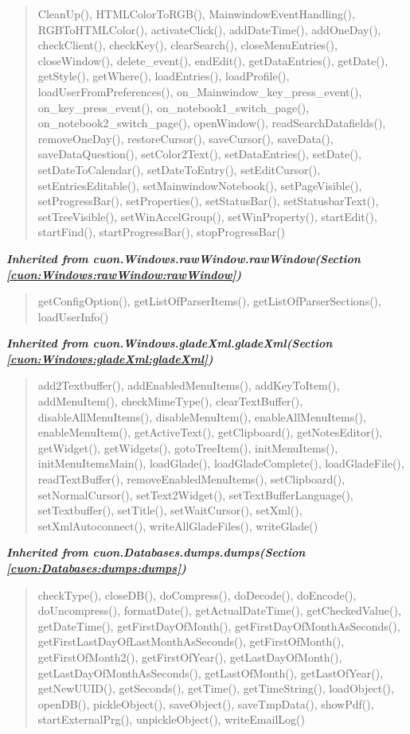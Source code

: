 \begin{quote}
CleanUp(), HTMLColorToRGB(), MainwindowEventHandling(), RGBToHTMLColor(), activateClick(), addDateTime(), addOneDay(), checkClient(), checkKey(), clearSearch(), closeMenuEntries(), closeWindow(), delete\_event(), endEdit(), getDataEntries(), getDate(), getStyle(), getWhere(), loadEntries(), loadProfile(), loadUserFromPreferences(), on\_Mainwindow\_key\_press\_event(), on\_key\_press\_event(), on\_notebook1\_switch\_page(), on\_notebook2\_switch\_page(), openWindow(), readSearchDatafields(), removeOneDay(), restoreCursor(), saveCursor(), saveData(), saveDataQuestion(), setColor2Text(), setDataEntries(), setDate(), setDateToCalendar(), setDateToEntry(), setEditCursor(), setEntriesEditable(), setMainwindowNotebook(), setPageVisible(), setProgressBar(), setProperties(), setStatusBar(), setStatusbarText(), setTreeVisible(), setWinAccelGroup(), setWinProperty(), startEdit(), startFind(), startProgressBar(), stopProgressBar()
\end{quote}

\large{\textbf{\textit{Inherited from cuon.Windows.rawWindow.rawWindow\textit{(Section \ref{cuon:Windows:rawWindow:rawWindow})}}}}

\begin{quote}
getConfigOption(), getListOfParserItems(), getListOfParserSections(), loadUserInfo()
\end{quote}

\large{\textbf{\textit{Inherited from cuon.Windows.gladeXml.gladeXml\textit{(Section \ref{cuon:Windows:gladeXml:gladeXml})}}}}

\begin{quote}
add2Textbuffer(), addEnabledMenuItems(), addKeyToItem(), addMenuItem(), checkMimeType(), clearTextBuffer(), disableAllMenuItems(), disableMenuItem(), enableAllMenuItems(), enableMenuItem(), getActiveText(), getClipboard(), getNotesEditor(), getWidget(), getWidgets(), gotoTreeItem(), initMenuItems(), initMenuItemsMain(), loadGlade(), loadGladeComplete(), loadGladeFile(), readTextBuffer(), removeEnabledMenuItems(), setClipboard(), setNormalCursor(), setText2Widget(), setTextBufferLanguage(), setTextbuffer(), setTitle(), setWaitCursor(), setXml(), setXmlAutoconnect(), writeAllGladeFiles(), writeGlade()
\end{quote}

\large{\textbf{\textit{Inherited from cuon.Databases.dumps.dumps\textit{(Section \ref{cuon:Databases:dumps:dumps})}}}}

\begin{quote}
checkType(), closeDB(), doCompress(), doDecode(), doEncode(), doUncompress(), formatDate(), getActualDateTime(), getCheckedValue(), getDateTime(), getFirstDayOfMonth(), getFirstDayOfMonthAsSeconds(), getFirstLastDayOfLastMonthAsSeconds(), getFirstOfMonth(), getFirstOfMonth2(), getFirstOfYear(), getLastDayOfMonth(), getLastDayOfMonthAsSeconds(), getLastOfMonth(), getLastOfYear(), getNewUUID(), getSeconds(), getTime(), getTimeString(), loadObject(), openDB(), pickleObject(), saveObject(), saveTmpData(), showPdf(), startExternalPrg(), unpickleObject(), writeEmailLog()
\end{quote}


